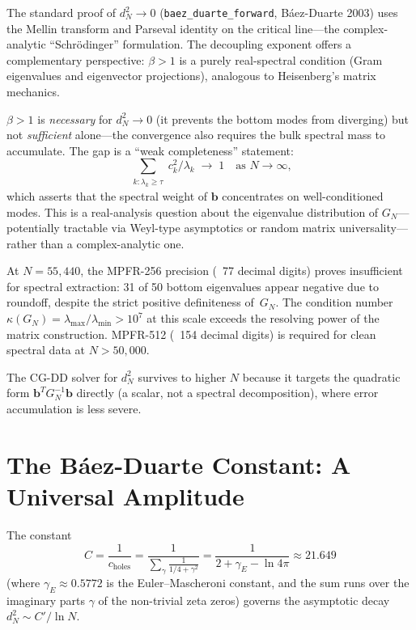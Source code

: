 \documentclass[11pt,a4paper]{article}
\begin{document}
\begin{remark}
The standard proof of $d_N^2 \to 0$ (\texttt{baez\_duarte\_forward},
B\'aez-Duarte 2003) uses the Mellin transform and Parseval identity on
the critical line---the complex-analytic ``Schr\"odinger'' formulation.
The decoupling exponent offers a complementary perspective: $\beta > 1$
is a purely real-spectral condition (Gram eigenvalues and eigenvector
projections), analogous to Heisenberg's matrix mechanics.

$\beta > 1$ is \emph{necessary} for $d_N^2 \to 0$ (it prevents the
bottom modes from diverging) but not \emph{sufficient} alone---the
convergence also requires the bulk spectral mass to accumulate.
The gap is a ``weak completeness'' statement:
\[
  \sum_{\substack{k : \lambda_k \geq \tau}} c_k^2 / \lambda_k
  \;\to\; 1 \quad \text{as } N \to \infty,
\]
which asserts that the spectral weight of $\mathbf{b}$ concentrates
on well-conditioned modes. This is a real-analysis question about
the eigenvalue distribution of $G_N$---potentially tractable via
Weyl-type asymptotics or random matrix universality---rather than
a complex-analytic one.
\end{remark}

\begin{remark}
At $N = 55{,}440$, the MPFR-256 precision (~77 decimal digits) proves
insufficient for spectral extraction: 31 of 50 bottom eigenvalues
appear negative due to roundoff, despite the strict positive
definiteness of~$G_N$. The condition number
$\kappa(G_N) = \lambda_{\max}/\lambda_{\min} > 10^7$ at this scale
exceeds the resolving power of the matrix construction.
MPFR-512 (~154 decimal digits) is required for clean spectral data
at $N > 50{,}000$.

The CG-DD solver for $d_N^2$ survives to higher $N$ because it targets
the quadratic form $\mathbf{b}^T G_N^{-1} \mathbf{b}$ directly
(a scalar, not a spectral decomposition), where error accumulation
is less severe.
\end{remark}

\section{The B\'aez-Duarte Constant: A Universal Amplitude}
\label{sec:constant}

The constant
\[
  C = \frac{1}{c_{\text{holes}}}
  = \frac{1}{\displaystyle\sum_\gamma \frac{1}{1/4 + \gamma^2}}
  = \frac{1}{2 + \gamma_E - \ln 4\pi}
  \approx 21.649
\]
(where $\gamma_E \approx 0.5772$ is the Euler--Mascheroni constant,
and the sum runs over the imaginary parts $\gamma$ of the non-trivial
zeta zeros) governs the asymptotic decay $d_N^2 \sim C'/\ln N$.
\end{document}
